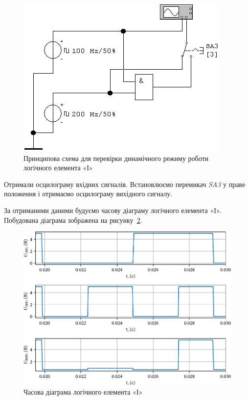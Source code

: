 \documentclass[a4paper,oneside,DIV=10,12pt]{scrartcl}
\newcommand\schel[1]{\textit{#1}}
\begin{document}
			\begin{figure}[!htbp]
			\centering
				\includegraphics[]{schematics/02-02-AND.png}
			\caption{Принципова схема для перевірки динамічного режиму роботи логічного елемента «І»}
			\label{fig:AND-dynamic-mode-schematic}
			\end{figure}
			
			Отримали осцилограму вхідних сигналів. Встановлюємо перемикач \schel{SA3} у праве положення і отримаємо осцилограму вихідного сигналу.
			
			За отриманими даними будуємо часову діаграму логічного елемента «І». Побудована діаграма зображена на рисунку~\ref{fig:AND-time-diagram}.
			
			\begin{figure}[!htbp]
			\centering
				\includegraphics[width=\textwidth]{plots/03-pdf/02-AND-time-diagram-edited.pdf}
			\caption{Часова діаграма логічного елемента «І»}
			\label{fig:AND-time-diagram}
			\end{figure}
			
\end{document}
